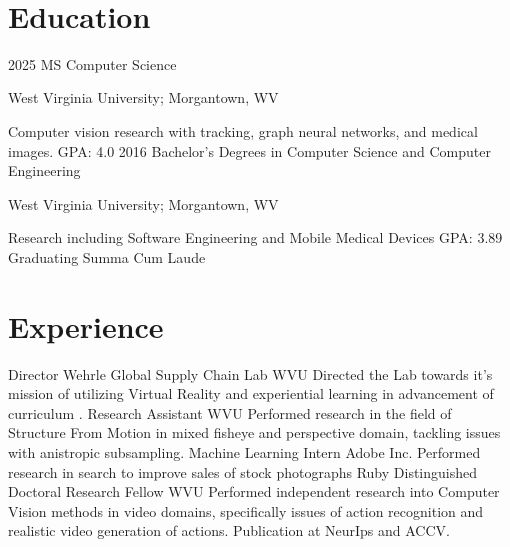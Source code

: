 \documentclass[]{friggeri-cv}
\begin{document}
\begin{aside}
\begin{itemize}
        
        
         
    \end{itemize}
    ~
 
 
\end{aside}



\section{Education}
\begin{entrylist}
    \entry
    {2025}
    {MS Computer Science}
    {\begin{flushright}West Virginia University; Morgantown, WV\end{flushright}}
    {Computer vision research with tracking, graph neural networks, and medical images. GPA: 4.0 
    }
    \entry
    {2016}
    {Bachelor's Degrees in Computer Science and Computer Engineering}
    {\begin{flushright}West Virginia University; Morgantown, WV\end{flushright}}
    {Research including Software Engineering and Mobile Medical Devices
    GPA: 3.89  Graduating Summa Cum Laude
    }
  
  
\end{entrylist}

\section{Experience}
\begin{entrylist}
    {Director Wehrle Global Supply Chain Lab}
    {
    WVU
    }
    { Directed the Lab towards it's mission of utilizing Virtual Reality and experiential learning in advancement of curriculum . }
    {Research Assistant}
    {
    WVU
    }
    { Performed research in the field of Structure From Motion in mixed fisheye and perspective domain, tackling issues with anistropic subsampling. }
    {Machine Learning Intern}
    {
    Adobe Inc.
    }
    {
    Performed research in search to improve sales of stock photographs
    }
    {Ruby Distinguished Doctoral Research Fellow}
    {
     WVU
    }
    { Performed independent research into Computer Vision methods in video domains, specifically issues of action recognition and realistic video generation of actions. Publication at NeurIps and ACCV. }

    
\end{entrylist}
\end{document}

